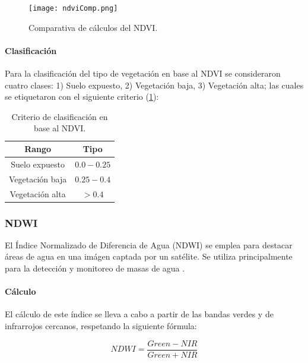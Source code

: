 \begin{figure}[H]
	\texttt{[image: ndviComp.png]}
	\centering
	\caption{Comparativa de cálculos del NDVI.}
	\label{fig:ndvi-comp}
\end{figure}

\paragraph{Clasificación} \label{clasificacion}

Para la clasificación del tipo de vegetación en base al NDVI se consideraron cuatro clases: 1) Suelo expuesto, 2) Vegetación baja, 3) Vegetación alta; las cuales se etiquetaron con el siguiente criterio (\tablename    \ref{table:ndvi-criterio}): 

\onehalfspacing
\begin{table}[H]
\begin{center}
	\begin{tabular}{|c | c |} 
		\hline
		\textbf{Rango} & \textbf{Tipo}\\
		\hline
		Suelo expuesto & $0.0-0.25$ \\
		\hline
		Vegetación baja & $0.25-0.4$ \\
		\hline
		Vegetación alta & $> 0.4$ \\
		\hline
	\end{tabular}
\end{center}
\caption{Criterio de clasificación en base al NDVI.}
\label{table:ndvi-criterio}
\end{table}
\singlespacing

\subsubsection{NDWI}

El Índice Normalizado de Diferencia de Agua (NDWI) se emplea para destacar áreas de agua en una imágen captada por un satélite. Se utiliza principalmente para la detección y monitoreo de masas de agua \parencite{noauthor_ndwi_2021}. 

\paragraph{Cálculo}

El cálculo de este índice se lleva a cabo a partir de las bandas verdes y de infrarrojos cercanos, respetando la siguiente fórmula:

$$NDWI = \frac{Green - NIR}{Green + NIR}$$

